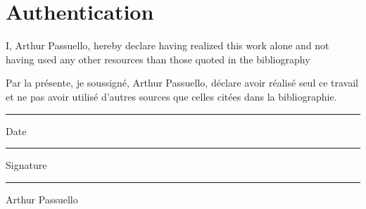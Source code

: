 \documentclass[
11pt, %
english, %
singlespacing, %
headsepline, %
]{MastersDoctoralThesis} %
\begin{document}
\textcolor{bleu}{
\tableofcontents} %



\mainmatter %

\pagestyle{thesis} %
\setcounter{page}{1}
\setcounter{chapter}{0}



 

%

% 
% 



%
\chapter{Authentication}
I, Arthur Passuello, hereby declare having realized this work alone and not having used any other resources than those quoted in the bibliography 

Par la présente, je soussigné, Arthur Passuello, déclare avoir réalisé seul ce travail et ne pas avoir utilisé d'autres sources que celles citées dans la bibliographie.


\vspace*{5cm}


\begin{multicols}{2}
 
 \noindent\rule[0.5ex]{\linewidth}{1pt}
 Date
 
 \columnbreak
 
 \noindent\rule[0.5ex]{\linewidth}{1pt}
 Signature
 
 \vspace*{2cm}
 
 \noindent\rule[0.5ex]{\linewidth}{1pt}
Arthur Passuello
\end{multicols}
\listofalgorithms
\listoffigures
\end{document}
